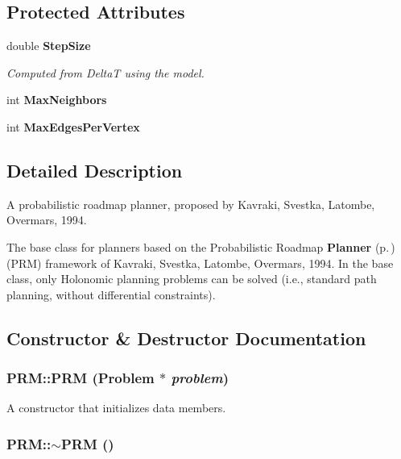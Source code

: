 \subsection*{Protected Attributes}
\begin{CompactItemize}
\item 
double {\bf Step\-Size}
\begin{CompactList}\small\item\em Computed from Delta\-T using the model.\item\end{CompactList}\item 
int {\bf Max\-Neighbors}
\item 
int {\bf Max\-Edges\-Per\-Vertex}
\end{CompactItemize}


\subsection{Detailed Description}
A probabilistic roadmap planner, proposed by Kavraki, Svestka, Latombe, Overmars, 1994.

The base class for planners based on the Probabilistic Roadmap {\bf Planner} {\rm (p.\,\pageref{class_Planner})} (PRM) framework of Kavraki, Svestka, Latombe, Overmars, 1994. In the base class, only Holonomic planning problems can be solved (i.e., standard path planning, without differential constraints). 



\subsection{Constructor \& Destructor Documentation}
\subsubsection{\setlength{\rightskip}{0pt plus 5cm}PRM::PRM ({\bf Problem} $\ast$ {\em problem})}\label{class_PRM_a0}


A constructor that initializes data members.

\subsubsection{\setlength{\rightskip}{0pt plus 5cm}PRM::$\sim$PRM ()\hspace{0.3cm}{\tt  [inline, virtual]}}\label{class_PRM_a1}


